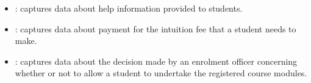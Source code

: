 \begin{itemize}[noitemsep]
  \item {}: captures data about help information provided to students.
  \item {}: captures data about payment for the intuition fee that a student needs to make.
  \item {}: captures data about the decision made by an enrolment officer concerning whether or not to allow a student to undertake the registered course modules.
\end{itemize}


%

